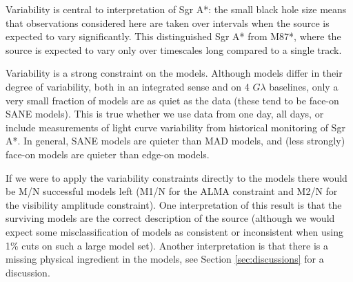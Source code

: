 Variability is central to interpretation of Sgr A*: the small black hole size means that observations considered here are taken over intervals when the source is expected to vary significantly.  This distinguished Sgr A* from M87*, where the source is expected to vary only over timescales long compared to a single track.

Variability is a strong constraint on the models.  Although models differ in their degree of variability, both in an integrated sense and on 4 $G\lambda$ baselines, only a very small fraction of models are as quiet as the data (these tend to be face-on SANE models).  This is true whether we use data from one day, all days, or include measurements of light curve variability from historical monitoring of Sgr A*.   In general, SANE models are quieter than MAD models, and (less strongly) face-on models are quieter than edge-on models.

If we were to apply the variability constraints directly to the models there would be M/N successful models left (M1/N for the ALMA constraint and M2/N for the visibility amplitude constraint).  One interpretation of this result is that the surviving models are the correct description of the source (although we would expect some misclassification of models as consistent or inconsistent when using 1\% cuts on such a large model set).  Another interpretation is that there is a missing physical ingredient in the models, see Section \ref{sec:discussions} for a discussion.


